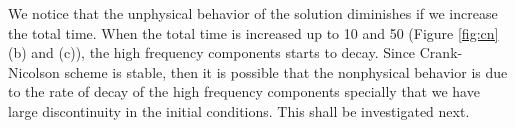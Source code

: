 We notice that the unphysical behavior of the solution diminishes if we increase the total time. When the total time is increased up to 10 and 50 (Figure \ref{fig:cn}(b) and (c)), the high frequency components starts to decay. Since Crank-Nicolson scheme is stable, then it is possible that the nonphysical behavior is due to the rate of decay of the high frequency components specially that we have large discontinuity in the initial conditions. This shall be investigated next. 

 \begin{figure}[!tbh]
 \centering 

\end{figure}
